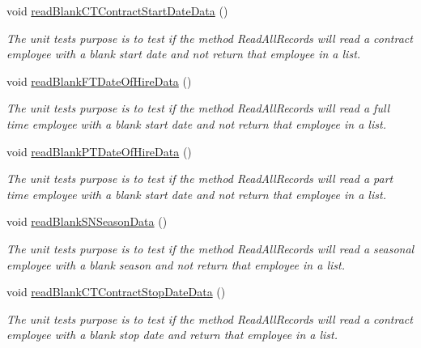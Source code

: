 \begin{DoxyCompactItemize}
void \hyperlink{class_file_i_o_tests_1_1_file_i_o_tests_a9362c9597624455d26cb42bb34a4f342}{read\+Blank\+C\+T\+Contract\+Start\+Date\+Data} ()
\begin{DoxyCompactList}\small\item\em The unit test\textquotesingle{}s purpose is to test if the method Read\+All\+Records will read a contract employee with a blank start date and not return that employee in a list. \end{DoxyCompactList}\item 
void \hyperlink{class_file_i_o_tests_1_1_file_i_o_tests_a000ec15aab13637cd8dc13b77ec1ef39}{read\+Blank\+F\+T\+Date\+Of\+Hire\+Data} ()
\begin{DoxyCompactList}\small\item\em The unit test\textquotesingle{}s purpose is to test if the method Read\+All\+Records will read a full time employee with a blank start date and not return that employee in a list. \end{DoxyCompactList}\item 
void \hyperlink{class_file_i_o_tests_1_1_file_i_o_tests_aefaac22298eec1af951af4ca2a42ede4}{read\+Blank\+P\+T\+Date\+Of\+Hire\+Data} ()
\begin{DoxyCompactList}\small\item\em The unit test\textquotesingle{}s purpose is to test if the method Read\+All\+Records will read a part time employee with a blank start date and not return that employee in a list. \end{DoxyCompactList}\item 
void \hyperlink{class_file_i_o_tests_1_1_file_i_o_tests_aca2cb3e7d051bad35675d663272af2ef}{read\+Blank\+S\+N\+Season\+Data} ()
\begin{DoxyCompactList}\small\item\em The unit test\textquotesingle{}s purpose is to test if the method Read\+All\+Records will read a seasonal employee with a blank season and not return that employee in a list. \end{DoxyCompactList}\item 
void \hyperlink{class_file_i_o_tests_1_1_file_i_o_tests_a629ae85c2e1179291498d84736051cc3}{read\+Blank\+C\+T\+Contract\+Stop\+Date\+Data} ()
\begin{DoxyCompactList}\small\item\em The unit test\textquotesingle{}s purpose is to test if the method Read\+All\+Records will read a contract employee with a blank stop date and return that employee in a list. \end{DoxyCompactList}\item 

\end{DoxyCompactItemize}
